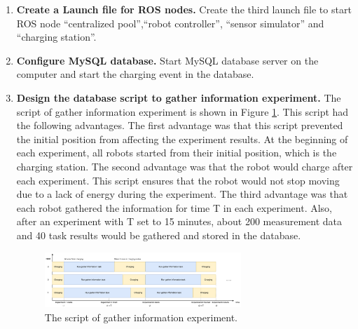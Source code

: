 \begin{enumerate}
 \item \textbf{Create a Launch file for ROS nodes.} Create the third launch file to start ROS node ``centralized pool'',``robot controller'', ``sensor simulator'' and ``charging station''. 
 \item \textbf{Configure MySQL database.} Start MySQL database server on the computer and start the charging event in the database.
 \item \textbf{Design the database script to gather information experiment.} The script of gather information experiment is shown in Figure \ref{fig:env_exp_timeline}. This script had the following advantages. The first advantage was that this script prevented the initial position from affecting the experiment results. At the beginning of each experiment, all robots started from their initial position, which is the charging station. The second advantage was that the robot would charge after each experiment. This script ensures that the robot would not stop moving due to a lack of energy during the experiment. The third advantage was that each robot gathered the information for time T in each experiment. Also, after an experiment with T set to 15 minutes, about 200 measurement data and 40 task results would be gathered and stored in the database. 
 \begin{figure}[htbp]
    \centering
    \includegraphics[width = 0.7\textwidth]{content/images/ch5/env_exp_timeline.drawio.png}
    \caption{The script of gather information experiment.}
    \label{fig:env_exp_timeline}
 \end{figure}


\end{enumerate}
